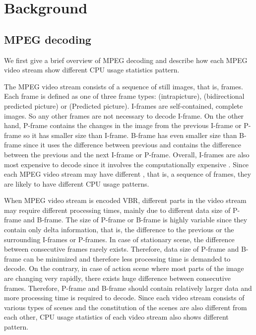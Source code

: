\section{Background}
\label{sec:background}
\subsection{MPEG decoding}
We first give a brief overview of MPEG decoding and describe how each MPEG video stream show different CPU usage statistics pattern. 

The MPEG video stream consists of a sequence of still images, that is, frames. 
Each frame is defined as one of three frame types:  (intrapicture),  (bidirectional predicted picture) or  (Predicted picture).
I-frames are self-contained, complete images.  
So any other frames are not necessary to decode I-frame.
On the other hand, P-frame contains the changes in the image from the previous I-frame or P-frame so it has smaller size than I-frame.
B-frame has even smaller size than B-frame since it uses the difference between previous and contains the difference between the previous and the next I-frame or P-frame. 
Overall, I-frames are also most expensive to decode since it involves the computationally expensive .
Since each MPEG video stream may have different , that is, a sequence of frames, they are likely to have different CPU usage patterns. 

When MPEG video stream is encoded VBR, different parts in the video stream may require different processing times, mainly due to different data size of P-frame and B-frame. 
The size of P-frame or B-frame is highly variable since they contain only delta information, that is, the difference to the previous or the surrounding I-frames or P-frames.
In case of stationary scene, the difference between consecutive frames rarely exists. 
Therefore, data size of P-frame and B-frame can be minimized and therefore less processing time is demanded to decode. 
On the contrary, in case of action scene where most parts of the image are changing very rapidly, there exists huge difference between consecutive frames. 
Therefore, P-frame and B-frame should contain relatively larger data and more processing time is required to decode.
Since each video stream consists of various types of scenes and the constitution of the scenes are also different from each other, CPU usage statistics of each video stream also shows different pattern. 
